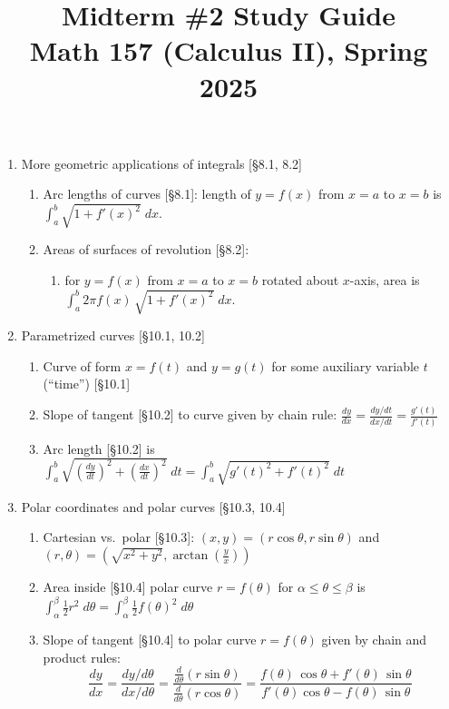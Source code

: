 \documentclass[11pt]{article}
\title{Midterm \#2 Study Guide \\ Math 157 (Calculus II), Spring 2025}
\date{}
\begin{document}
\maketitle

\thispagestyle{empty}

\vspace{-2cm}

\begin{enumerate}
\item More geometric applications of integrals [\S8.1, 8.2]
\begin{enumerate}
\item Arc lengths of curves [\S8.1]: length of $y=f(x)$ from $x=a$ to $x=b$ is $\int_{a}^{b} \sqrt{1+f'(x)^2} \; dx$.
\item Areas of surfaces of revolution [\S8.2]: 
\begin{enumerate}
\item for $y=f(x)$ from $x=a$ to $x=b$ rotated about $x$-axis, area is $\int_{a}^{b} 2\pi f(x) \, \sqrt{1+f'(x)^2} \; dx$.
\end{enumerate}
\end{enumerate}

\item Parametrized curves [\S10.1, 10.2]
\begin{enumerate}
\item Curve of form $x=f(t)$ and $y=g(t)$ for some auxiliary variable $t$ (``time'') [\S10.1]
\item Slope of tangent [\S10.2] to curve given by chain rule: $\frac{dy}{dx} = \frac{dy/dt}{dx/dt} = \frac{g'(t)}{f'(t)}$ 
\item Arc length [\S10.2] is $\int_{a}^{b} \sqrt{(\frac{dy}{dt})^2 + (\frac{dx}{dt})^2} \; dt = \int_{a}^{b} \sqrt{g'(t)^2 + f'(t)^2} \; dt$
\end{enumerate}

\item Polar coordinates and polar curves [\S10.3, 10.4]
\begin{enumerate}
\item Cartesian vs.~polar [\S10.3]: $(x,y) = (r\cos \theta, r \sin \theta)$ and $(r,\theta) = (\sqrt{x^2+y^2}, \arctan (\frac{y}{x}))$
\item Area inside [\S10.4] polar curve $r=f(\theta)$ for $\alpha \leq \theta \leq \beta$ is $\int_{\alpha}^{\beta} \frac{1}{2} r^2 \; d\theta=\int_{\alpha}^{\beta} \frac{1}{2} f(\theta)^2 \; d\theta$ 
\item Slope of tangent [\S10.4] to polar curve $r=f(\theta)$ given by chain and product rules: 
{\small \[\frac{dy}{dx} = \frac{dy/d\theta}{dx/d\theta} = \frac{\frac{d}{d\theta}(r \sin\theta)}{\frac{d}{d\theta}(r \cos\theta)} = \frac{f(\theta)\, \cos \theta  + f'(\theta) \, \sin \theta}{f'(\theta)\cos\theta-f(\theta)\, \sin\theta }\]}
\end{enumerate}

\end{enumerate}
\end{document}
